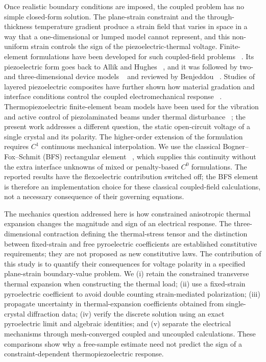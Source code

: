 \documentclass[pdflatex,sn-mathphys-num]{sn-jnl}
\begin{document}
Once realistic boundary conditions are imposed, the coupled problem has no simple
closed-form solution. The plane-strain constraint and the through-thickness temperature
gradient produce a strain field that varies in space in a way that a one-dimensional or
lumped model cannot represent, and this non-uniform strain controls the sign of the
piezoelectric-thermal voltage. Finite-element formulations have been developed for such
coupled-field problems ~\cite{ZienkiewiczTaylor2005,Hughes2000,Belytschko2000,Bathe1996}.
Its piezoelectric form goes back to Allik and Hughes ~\cite{AllikHughes1970}, and it was
followed by two- and three-dimensional device models ~\cite{Lerch1990,Tzou1993} and
reviewed by Benjeddou ~\cite{Benjeddou2000a}. Studies of layered piezoelectric
composites have further shown how material gradation and interface conditions control
the coupled electromechanical response ~\cite{Gupta2025CS}. Thermopiezoelectric finite-element beam
models have been used for the vibration and active control of piezolaminated beams
under thermal disturbance ~\cite{Sanbi2014ThermoPyroBeam}; the present work addresses a
different question, the static open-circuit voltage of a single crystal and its
polarity. The higher-order extension of the formulation requires $C^1$
continuous mechanical interpolation. We use the classical
Bogner--Fox--Schmit (BFS) rectangular element ~\cite{Bogner1965}, which supplies this continuity without the extra
interface unknowns of mixed or penalty-based $C^0$ formulations. The reported
results have the flexoelectric contribution switched off; the BFS element is
therefore an implementation choice for these classical coupled-field calculations,
not a necessary consequence of their governing equations.

The mechanics question addressed here is how constrained anisotropic thermal
expansion changes the magnitude and sign of an electrical response. The
three-dimensional contraction defining the thermal-stress tensor and the distinction
between fixed-strain and free pyroelectric coefficients are established constitutive
requirements; they are not proposed as new constitutive laws. The contribution of
this study is to quantify their consequences for voltage polarity in a specified
plane-strain boundary-value problem. We (i) retain the constrained transverse
thermal expansion when constructing the thermal load; (ii) use a fixed-strain
pyroelectric coefficient to avoid double counting strain-mediated polarization;
(iii) propagate uncertainty in thermal-expansion coefficients obtained from
single-crystal diffraction data; (iv) verify the discrete solution using an exact
pyroelectric limit and algebraic identities; and (v) separate the electrical
mechanisms through mesh-converged coupled and uncoupled calculations. These
comparisons show why a free-sample estimate need not predict the sign of a
constraint-dependent thermopiezoelectric response.
\end{document}
